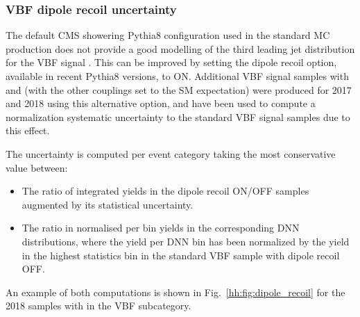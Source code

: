 \documentclass[../main.tex]{subfiles}
\begin{document}
\subsubsection*{VBF dipole recoil uncertainty}

The default CMS showering Pythia8 configuration used in the standard MC production does not provide a good modelling of the third leading jet distribution for the VBF signal \cite{hh:results:dipole_recoil}. This can be improved by setting the dipole recoil option, available in recent Pythia8 versions, to ON. Additional VBF signal samples with  and  (with the other couplings set to the SM expectation) were produced for 2017 and 2018 using this alternative option, and have been used to compute a normalization systematic uncertainty to the standard VBF signal samples due to this effect.

The uncertainty is computed per event category taking the most conservative value between:
\begin{itemize}
\item The ratio of integrated yields in the dipole recoil ON/OFF samples augmented by its statistical uncertainty.
\item The ratio in normalised per bin yields in the corresponding DNN distributions, where the yield per DNN bin has been normalized by the yield in the highest statistics bin in the standard VBF sample with dipole recoil OFF.
\end{itemize}

An example of both computations is shown in Fig.~\ref{hh:fig:dipole_recoil} for the 2018 samples with  in the VBF subcategory.
\end{document}

